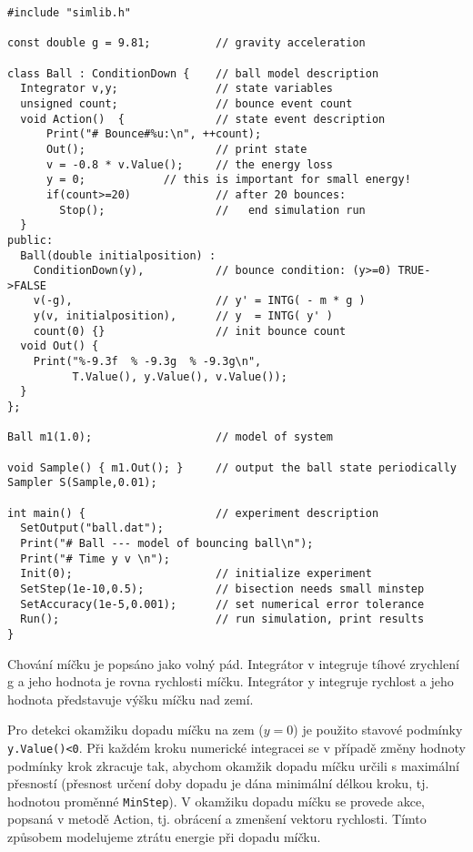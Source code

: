 \documentclass[a4paper]{article}
\begin{document}
{\small
\begin{verbatim}
#include "simlib.h"

const double g = 9.81;          // gravity acceleration

class Ball : ConditionDown {    // ball model description
  Integrator v,y;               // state variables
  unsigned count;               // bounce event count
  void Action()  {              // state event description
      Print("# Bounce#%u:\n", ++count);
      Out();                    // print state
      v = -0.8 * v.Value();     // the energy loss
      y = 0;            // this is important for small energy!
      if(count>=20)             // after 20 bounces:
        Stop();                 //   end simulation run
  }
public:
  Ball(double initialposition) :
    ConditionDown(y),           // bounce condition: (y>=0) TRUE->FALSE
    v(-g),                      // y' = INTG( - m * g )
    y(v, initialposition),      // y  = INTG( y' )
    count(0) {}                 // init bounce count
  void Out() {
    Print("%-9.3f  % -9.3g  % -9.3g\n",
          T.Value(), y.Value(), v.Value());
  }
};

Ball m1(1.0);                   // model of system

void Sample() { m1.Out(); }     // output the ball state periodically
Sampler S(Sample,0.01);

int main() {                    // experiment description
  SetOutput("ball.dat");
  Print("# Ball --- model of bouncing ball\n");
  Print("# Time y v \n");
  Init(0);                      // initialize experiment
  SetStep(1e-10,0.5);           // bisection needs small minstep
  SetAccuracy(1e-5,0.001);      // set numerical error tolerance
  Run();                        // run simulation, print results
}
\end{verbatim}
}

Chování míčku je popsáno jako volný pád. Integrátor v integruje
tíhové zrychlení g a jeho hodnota je rovna rychlosti míčku.
Integrátor y integruje rychlost a jeho hodnota představuje výšku
míčku nad zemí.

Pro detekci okamžiku dopadu míčku na zem ($y=0$) je použito stavové podmínky
\verb|y.Value()<0|.
Při každém kroku numerické integracei se v případě změny hodnoty
podmínky krok zkracuje tak, abychom okamžik dopadu míčku určili s
maximální přesností (přesnost určení doby dopadu je dána minimální délkou
kroku, tj. hodnotou proměnné \verb|MinStep|). V okamžiku dopadu míčku se provede
akce, popsaná v metodě Action, tj. obrácení a zmenšení vektoru rychlosti.
Tímto způsobem modelujeme ztrátu energie při dopadu míčku.
\end{document}
